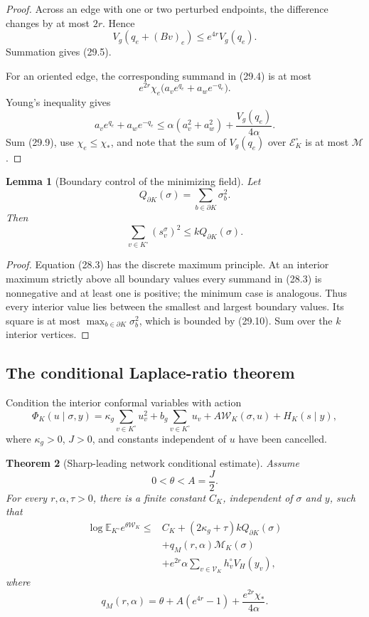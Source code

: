 \documentclass[11pt]{article}
\newtheorem{theorem}{Theorem}[section]
\newtheorem{lemma}[theorem]{Lemma}
\theoremstyle{remark}
\begin{document}
\begin{proof}
Across an edge with one or two perturbed endpoints, the difference
changes by at most \(2r\).  Hence
\[
 V_g(q_e+(Bv)_e)\leq e^{4r}V_g(q_e).               \tag{29.7}
\]
Summation gives (29.5).

For an oriented edge, the corresponding summand in (29.4) is at most
\[
 e^{2r}\chi_e
 \bigl(a_ve^{q_e}+a_we^{-q_e}\bigr).               \tag{29.8}
\]
Young's inequality gives
\[
 a_ve^{q_e}+a_we^{-q_e}
 \leq\alpha(a_v^2+a_w^2)+\frac{V_g(q_e)}{4\alpha}.
                                                               \tag{29.9}
\]
Sum (29.9), use \(\chi_e\leq\chi_*\), and note that the sum of
\(V_g(q_e)\) over \(\mathcal E_K^\circ\) is at most \(\mathcal M\).
\end{proof}

\begin{lemma}[Boundary control of the minimizing field]
\label{lem:v17v29-maximum}
Let
\[
 Q_{\partial K}(\sigma)=\sum_{b\in\partial K}\sigma_b^2.       \tag{29.10}
\]
Then
\[
 \sum_{v\in K^\circ}(s_v^\sigma)^2
 \leq kQ_{\partial K}(\sigma).                    \tag{29.11}
\]
\end{lemma}

\begin{proof}
Equation (28.3) has the discrete maximum principle.  At an interior
maximum strictly above all boundary values every summand in (28.3) is
nonnegative and at least one is positive; the minimum case is
analogous.  Thus every interior value lies between the smallest and
largest boundary values.  Its square is at most
\(\max_{b\in\partial K}\sigma_b^2\), which is bounded by (29.10).
Sum over the \(k\) interior vertices.
\end{proof}

\subsection{The conditional Laplace-ratio theorem}

Condition the interior conformal variables with action
\[
 \Phi_K(u\mid\sigma,y)
 =\kappa_g\sum_{v\in K^\circ}u_v^2
 +b_g\sum_{v\in K^\circ}u_v
 +A\mathcal W_K(\sigma,u)+H_K(s\mid y),            \tag{29.12}
\]
where \(\kappa_g>0\), \(J>0\), and constants independent of \(u\)
have been cancelled.

\begin{theorem}[Sharp-leading network conditional estimate]
\label{thm:v17v29-conditional}
Assume
\[
 0<\theta<A=\frac J2.                              \tag{29.13}
\]
For every \(r,\alpha,\tau>0\), there is a finite constant \(C_K\),
independent of \(\sigma\) and \(y\), such that
\[
\begin{aligned}
 \log\mathbb E_{K^\circ}
 e^{\theta\mathcal W_K}
 \leq{}&C_K+(2\kappa_g+\tau)kQ_{\partial K}(\sigma)\\
 &+q_M(r,\alpha)\mathcal M_K(\sigma)\\
 &+e^{2r}\alpha\sum_{v\in\mathcal V_K}
 h_v^\circ V_H(y_v),                              \tag{29.14}
\end{aligned}
\]
where
\[
 \boxed{
 q_M(r,\alpha)
 =\theta+A(e^{4r}-1)
 +\frac{e^{2r}\chi_*}{4\alpha}.}                  \tag{29.15}
\]
\end{theorem}
\end{document}
